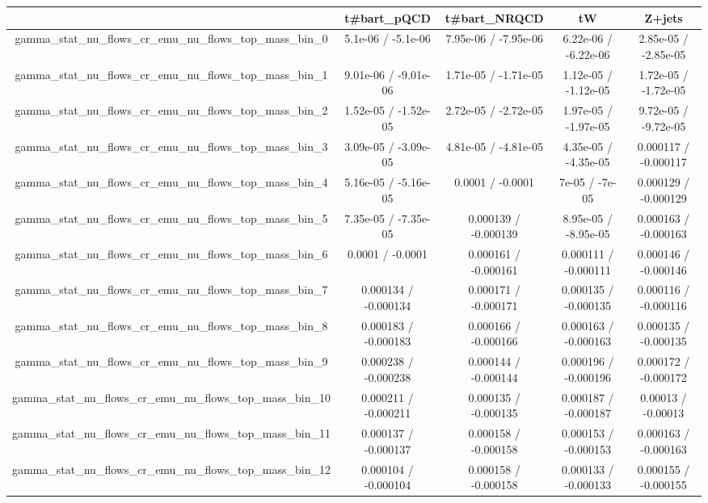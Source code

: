 \documentclass[10pt]{article}
\begin{document}
\begin{table}[htbp]
\begin{center}
\begin{tabular}{|c|c|c|c|c|}
\hline 
      & t#bar{t}_{pQCD}      & t#bar{t}_{NRQCD}      & tW      & Z+jets \\ 
\hline 
  gamma_stat_nu_flows_cr_emu_nu_flows_top_mass_bin_0 & 5.1e-06 / -5.1e-06 & 7.95e-06 / -7.95e-06 & 6.22e-06 / -6.22e-06 & 2.85e-05 / -2.85e-05 \\ 
  gamma_stat_nu_flows_cr_emu_nu_flows_top_mass_bin_1 & 9.01e-06 / -9.01e-06 & 1.71e-05 / -1.71e-05 & 1.12e-05 / -1.12e-05 & 1.72e-05 / -1.72e-05 \\ 
  gamma_stat_nu_flows_cr_emu_nu_flows_top_mass_bin_2 & 1.52e-05 / -1.52e-05 & 2.72e-05 / -2.72e-05 & 1.97e-05 / -1.97e-05 & 9.72e-05 / -9.72e-05 \\ 
  gamma_stat_nu_flows_cr_emu_nu_flows_top_mass_bin_3 & 3.09e-05 / -3.09e-05 & 4.81e-05 / -4.81e-05 & 4.35e-05 / -4.35e-05 & 0.000117 / -0.000117 \\ 
  gamma_stat_nu_flows_cr_emu_nu_flows_top_mass_bin_4 & 5.16e-05 / -5.16e-05 & 0.0001 / -0.0001 & 7e-05 / -7e-05 & 0.000129 / -0.000129 \\ 
  gamma_stat_nu_flows_cr_emu_nu_flows_top_mass_bin_5 & 7.35e-05 / -7.35e-05 & 0.000139 / -0.000139 & 8.95e-05 / -8.95e-05 & 0.000163 / -0.000163 \\ 
  gamma_stat_nu_flows_cr_emu_nu_flows_top_mass_bin_6 & 0.0001 / -0.0001 & 0.000161 / -0.000161 & 0.000111 / -0.000111 & 0.000146 / -0.000146 \\ 
  gamma_stat_nu_flows_cr_emu_nu_flows_top_mass_bin_7 & 0.000134 / -0.000134 & 0.000171 / -0.000171 & 0.000135 / -0.000135 & 0.000116 / -0.000116 \\ 
  gamma_stat_nu_flows_cr_emu_nu_flows_top_mass_bin_8 & 0.000183 / -0.000183 & 0.000166 / -0.000166 & 0.000163 / -0.000163 & 0.000135 / -0.000135 \\ 
  gamma_stat_nu_flows_cr_emu_nu_flows_top_mass_bin_9 & 0.000238 / -0.000238 & 0.000144 / -0.000144 & 0.000196 / -0.000196 & 0.000172 / -0.000172 \\ 
  gamma_stat_nu_flows_cr_emu_nu_flows_top_mass_bin_10 & 0.000211 / -0.000211 & 0.000135 / -0.000135 & 0.000187 / -0.000187 & 0.00013 / -0.00013 \\ 
  gamma_stat_nu_flows_cr_emu_nu_flows_top_mass_bin_11 & 0.000137 / -0.000137 & 0.000158 / -0.000158 & 0.000153 / -0.000153 & 0.000163 / -0.000163 \\ 
  gamma_stat_nu_flows_cr_emu_nu_flows_top_mass_bin_12 & 0.000104 / -0.000104 & 0.000158 / -0.000158 & 0.000133 / -0.000133 & 0.000155 / -0.000155 \\ 

\end{tabular}
\end{center}
\end{table}
\end{document}
